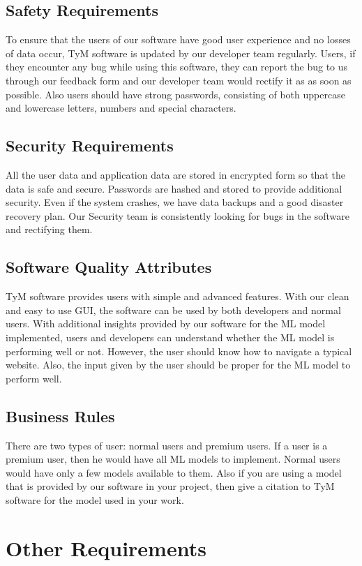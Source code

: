 \documentclass{scrreprt}
\begin{document}
\section{Safety Requirements}
To ensure that the users of our software have good user experience and no losses of data occur, TyM software is updated by our developer team regularly. Users, if they encounter any bug while using this software, they can report the bug to us through our feedback form and our developer team would rectify it as as soon as possible. Also users should have strong passwords, consisting of both uppercase and lowercase letters, numbers and special characters. 

\section{Security Requirements}
All the user data and application data are stored in encrypted form so that the data is safe and secure. Passwords are hashed and stored to provide additional security. Even if the system crashes, we have data backups and a good disaster recovery plan. Our Security team is consistently looking for bugs in the software and rectifying them.

\section{Software Quality Attributes}
TyM software provides users with simple and advanced features. With our clean and easy to use GUI, the software can be used by both developers and normal users. With additional insights provided by our software for the ML model implemented, users and developers can understand whether the ML model is performing well or not. However, the user should know how to navigate a typical website. Also, the input given by the user should be proper for the ML model to perform well.

\section{Business Rules}
There are two types of user: normal users and premium users. If a user is a premium user, then he would have all ML models to implement. Normal users would have only a few models available to them. Also if you are using a model that is provided by our software in your project, then give a citation to TyM software for the model used in your work.


\chapter{Other Requirements}
\end{document}
